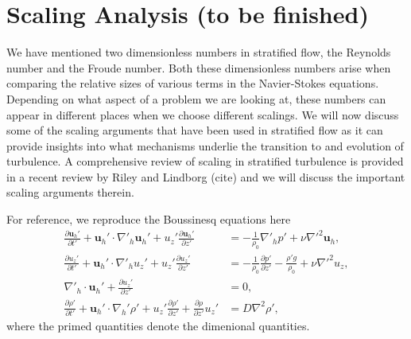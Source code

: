 \section{Scaling Analysis (to be finished)}
We have mentioned two dimensionless numbers in stratified flow, the Reynolds number and the Froude number. Both these dimensionless numbers arise when comparing the relative sizes of various terms in the Navier-Stokes equations. Depending on what aspect of a problem we are looking at, these numbers can appear in different places when we choose different scalings. We will now discuss some of the scaling arguments that have been used in stratified flow as it can provide insights into what mechanisms underlie the transition to and evolution of turbulence. A comprehensive review of scaling in stratified turbulence is provided in a recent review by Riley and Lindborg (cite) and we will discuss the important scaling arguments therein. 

For reference, we reproduce the Boussinesq equations here 
\begin{align}
\frac{\partial \textbf{u}_{h}'}{\partial t'} + \textbf{u}_{h}'\cdot\nabla'_{h}\textbf{u}_{h}'+u_{z}'\frac{\partial \textbf{u}_{h}'}{\partial z'} &= -\frac{1}{\rho_{0}}\nabla'_{h}p' + \nu \nabla'^{2}\textbf{u}_{h},\\
\frac{\partial u_{z}'}{\partial t'} + \textbf{u}_{h}'\cdot\nabla'_{h}u_{z}'+u_{z}'\frac{\partial u_{z}'}{\partial z'} &= -\frac{1}{\rho_{0}}\frac{\partial p'}{\partial z'} - \frac{\rho' g}{\rho_{0}} + \nu \nabla'^{2}u_{z},\\
\nabla'_{h}\cdot\textbf{u}_{h}' + \frac{\partial u_{z}'}{\partial z'} &=0,\\
\frac{\partial \rho'}{\partial t'} + \textbf{u}_{h}'\cdot\nabla_{h}'\rho' + u_{z}'\frac{\partial \rho'}{\partial z'} + \frac{\partial \rho}{\partial z'}u_{z}'&=D\nabla^{2}\rho ',
\end{align}
where the primed quantities denote the dimenional quantities. 

